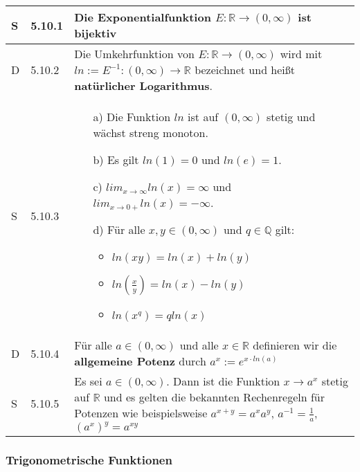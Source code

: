     \begin{longtable}{p{0.75cm} p{1cm} p{16cm}}
        \toprule
        S   & 5.10.1 &   Die Exponentialfunktion $E: \mathbb{R} \rightarrow (0,\infty)$ ist \textbf{bijektiv} \\
        \midrule
        D   & 5.10.2 &  Die Umkehrfunktion von $E: \mathbb{R} \rightarrow (0, \infty)$ wird mit $ln := E^{-1}: (0,\infty) \rightarrow \mathbb{R}$
                bezeichnet und heißt \textbf{natürlicher Logarithmus}. \\
        \midrule
        S   & 5.10.3 &  \begin{itemize}[topsep=-0.5cm]
            \item[a)] Die Funktion $ln$ ist auf $(0, \infty)$ stetig und wächst streng monoton.
            \item[b)] Es gilt $ln(1) = 0$ und $ln(e) = 1$.
            \item[c)] $lim_{x \rightarrow \infty} ln(x) = \infty$ und $lim_{x \rightarrow 0+} ln(x) = -\infty$.
            \item[d)] Für alle $x, y \in (0, \infty)$ und $q \in \mathbb{Q}$ gilt:
                        \begin{itemize}[topsep=-0.5cm]
                            \item $ln(xy) = ln(x) + ln(y)$
                            \item $ln(\frac{x}{y}) = ln(x) - ln(y)$
                            \item $ln(x^q) = q ln(x)$
                        \end{itemize} \vspace{-0cm} 
        \end{itemize} \\
        \midrule
        D   & 5.10.4 &  Für alle $a \in (0, \infty)$ und alle $x \in \mathbb{R}$ definieren wir die \textbf{allgemeine Potenz} durch $a^x := e^{x\cdot ln(a)}$ \\   
        \midrule
        S   & 5.10.5 &  Es sei $a \in (0,\infty)$. Dann ist die Funktion $x \rightarrow a^x$ stetig auf $\mathbb{R}$ und es gelten die bekannten
                        Rechenregeln für Potenzen wie beispielsweise $a^{x+y}=a^xa^y$, $a^{-1}=\frac{1}{a}$, $(a^x)^y=a^{xy}$ \\
        \bottomrule

    \end{longtable}

\subsubsection{Trigonometrische Funktionen}

